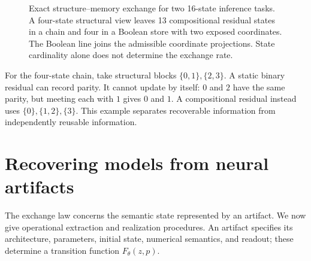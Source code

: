 \documentclass{article}
\theoremstyle{definition}
\begin{document}
\begin{figure}[t]
\centering
{}
\caption{Exact structure--memory exchange for two 16-state inference tasks. A four-state structural view leaves 13 compositional residual states in a chain and four in a Boolean store with two exposed coordinates. The Boolean line joins the admissible coordinate projections. State cardinality alone does not determine the exchange rate.}
\label{fig:exchange}
\end{figure}

For the four-state chain, take structural blocks $\{0,1\},\{2,3\}$. A static binary residual can record parity. It cannot update by itself: $0$ and $2$ have the same parity, but meeting each with $1$ gives $0$ and $1$. A compositional residual instead uses $\{0\},\{1,2\},\{3\}$. This example separates recoverable information from independently reusable information.

\section{Recovering models from neural artifacts}\label{sec:neural}
The exchange law concerns the semantic state represented by an artifact. We now give operational extraction and realization procedures. An artifact specifies its architecture, parameters, initial state, numerical semantics, and readout; these determine a transition function $F_\theta(z,p)$.
\end{document}

